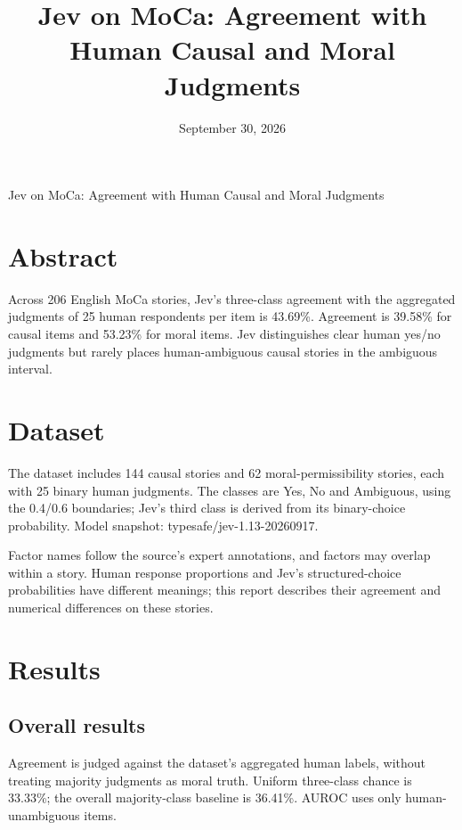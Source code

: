 \documentclass[10pt,a4paper]{article}
\title{\sffamily Jev on MoCa: Agreement with Human Causal and Moral Judgments}
\author{}
\date{September 30, 2026}
\begin{document}
\begin{center}{\sffamily\LARGE Jev on MoCa: Agreement with Human Causal and Moral Judgments\par}\vspace{8pt}{\small September 30, 2026}\end{center}\vspace{6pt}
\section*{Abstract}
Across 206 English MoCa stories, Jev’s three-class agreement with the aggregated judgments of 25 human respondents per item is 43.69\%. Agreement is 39.58\% for causal items and 53.23\% for moral items. Jev distinguishes clear human yes/no judgments but rarely places human-ambiguous causal stories in the ambiguous interval.
\section{Dataset}
The dataset includes 144 causal stories and 62 moral-permissibility stories, each with 25 binary human judgments. The classes are Yes, No and Ambiguous, using the 0.4/0.6 boundaries; Jev’s third class is derived from its binary-choice probability. Model snapshot: typesafe/jev-1.13-20260917.

Factor names follow the source’s expert annotations, and factors may overlap within a story. Human response proportions and Jev’s structured-choice probabilities have different meanings; this report describes their agreement and numerical differences on these stories.

\section{Results}
\subsection{Overall results}
Agreement is judged against the dataset’s aggregated human labels, without treating majority judgments as moral truth. Uniform three-class chance is 33.33\%; the overall majority-class baseline is 36.41\%. AUROC uses only human-unambiguous items.
\end{document}
